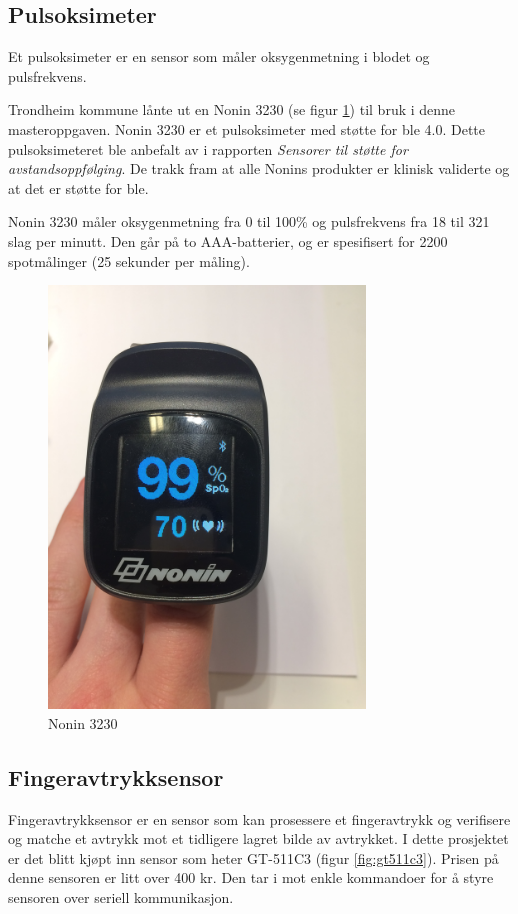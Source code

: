 \subsection{Pulsoksimeter}
Et pulsoksimeter er en sensor som måler oksygenmetning i blodet og pulsfrekvens.

Trondheim kommune lånte ut en Nonin 3230 (se figur \ref{fig:nonin-3230}) til bruk i denne masteroppgaven.
Nonin 3230 er et pulsoksimeter med støtte for \gls{ble} 4.0. Dette pulsoksimeteret ble anbefalt av \citet{austad2016sensorer}
i rapporten \textit{Sensorer til støtte for avstandsoppfølging}. De trakk fram at alle Nonins produkter
er klinisk validerte og at det er støtte for \gls{ble}. %

Nonin 3230 måler oksygenmetning fra 0 til 100\% og pulsfrekvens fra 18 til 321 slag per minutt. Den går på to
AAA-batterier, og er spesifisert for 2200 spotmålinger (25 sekunder per måling).

\begin{figure}
\includegraphics[width=0.75\textwidth, center]{fig/prototype/nonin3230ble}
\caption{Nonin 3230}
\label{fig:nonin-3230}
\end{figure}

\subsection{Fingeravtrykksensor}
Fingeravtrykksensor er en sensor som kan prosessere et fingeravtrykk og verifisere og matche et avtrykk mot
et tidligere lagret bilde av avtrykket. I dette prosjektet er det blitt kjøpt inn sensor som heter GT-511C3 (figur \ref{fig:gt511c3}).
Prisen på denne sensoren er litt over 400 kr. Den tar i mot enkle kommandoer for å styre sensoren over seriell kommunikasjon.

